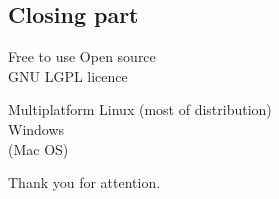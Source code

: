 \documentclass{beamer}
\begin{document}
\begin{frame}
\section{Closing part}
\begin{center}
	\begin{block}{Free to use}
		Open source\\
		GNU LGPL licence
	\end{block}
	\begin{block}{Multiplatform}
		Linux (most of distribution)\\
		Windows\\
		(Mac OS)
	\end{block}
\end{center}
\end{frame}
\begin{frame}
\begin{center}
	\Huge Thank you for attention.
\end{center}
\end{frame}
\end{document}
